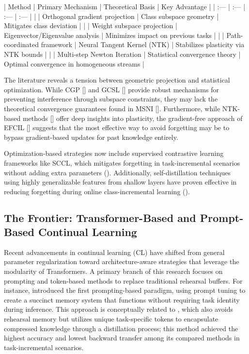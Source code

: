 \documentclass[11pt]{article}
\begin{document}
| Method | Primary Mechanism | Theoretical Basis | Key Advantage |
| :--- | :--- | :--- | :--- |
| \citep{2311.14905} | Orthogonal gradient projection | Class subspace geometry | Mitigates class deviation |
| \citep{2403.02334} | Weight subspace projection | Eigenvector/Eigenvalue analysis | Minimizes impact on previous tasks |
| \citep{2511.02025} | Path-coordinated framework | Neural Tangent Kernel (NTK) | Stabilizes plasticity via NTK bounds |
| \citep{2508.07419} | Multi-step Newton Iteration | Statistical convergence theory | Optimal convergence in homogeneous streams |

The literature reveals a tension between geometric projection and statistical optimization. While CGP [\citep{2311.14905}] and GCSL [\citep{2403.02334}] provide robust mechanisms for preventing interference through subspace constraints, they may lack the theoretical convergence guarantees found in MSNI [\citep{2508.07419}]. Furthermore, while NTK-based methods [\citep{2511.02025}] offer deep insights into plasticity, the gradient-free approach of EFCIL [\citep{2504.01219}] suggests that the most effective way to avoid forgetting may be to bypass gradient-based updates for past knowledge entirely.

Optimization-based strategies now include supervised contrastive learning frameworks like SCCL, which mitigates forgetting in task-incremental scenarios without adding extra parameters (\citep{2305.12270}). Additionally, self-distillation techniques using highly generalizable features from shallow layers have proven effective in reducing forgetting during online class-incremental learning (\citep{2409.11329}).
\subsection{The Frontier: Transformer-Based and Prompt-Based Continual Learning}

Recent advancements in continual learning (CL) have shifted from general parameter regularization toward architecture-aware strategies that leverage the modularity of Transformers. A primary branch of this research focuses on prompting and token-based methods to replace traditional rehearsal buffers. For instance, \citep{2112.08654} introduced the first prompting-based paradigm, using prompt tuning to create a succinct memory system that functions without requiring task identity during inference. This approach is conceptually related to \citep{2411.05846}, which also avoids rehearsal memory but utilizes unique task-specific tokens to encapsulate compressed knowledge through a distillation process; this method achieved the highest accuracy and lowest backward transfer among its compared methods in task-incremental scenarios.
\end{document}
